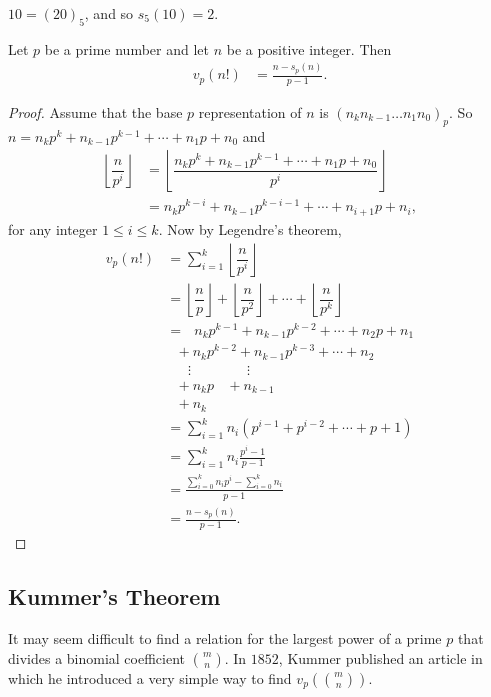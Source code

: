 \documentclass[12pt]{subfile}
\begin{document}
\begin{example}
	$10=(20)_5$, and so $s_5(10)=2$.
\end{example}


\begin{theorem}\label{thm:legendrealternative}
	Let $p$ be a prime number and let $n$ be a positive integer. Then
	\begin{align*}
	v_p(n!) & =\frac{n-s_p(n)}{p-1}.
	\end{align*}
\end{theorem}

\begin{proof}
	Assume that the base $p$ representation of $n$ is $(n_k n_{k-1}\ldots n_1 n_0)_p$. So $n=n_kp^k + n_{k-1}p^{k-1} + \cdots + n_1 p +n_0$ and
	\begin{align*}
	\left\lfloor\dfrac{n}{p^i}\right\rfloor &=	\left\lfloor\dfrac{n_kp^k + n_{k-1}p^{k-1} + \cdots + n_1 p +n_0}{p^i}\right\rfloor \\
	&= n_kp^{k-i} + n_{k-1}p^{k-i-1} + \cdots + n_{i+1} p + n_i,
	\end{align*}
	for any integer $1 \leq i \leq k$. Now by Legendre's theorem,
	\begin{align*}
	v_p(n!) & = \sum_{i=1}^{k}\left\lfloor\dfrac{n}{p^i}\right\rfloor\\
	&= \left\lfloor\dfrac{n}{p}\right\rfloor+\left\lfloor\dfrac{n}{p^2}\right\rfloor+\cdots+\left\lfloor\dfrac{n}{p^k}\right\rfloor\\
	&= \ \ \ n_kp^{k-1} + n_{k-1}p^{k-2} + \cdots + n_{2} p + n_1 \\  &\ \ \ + n_kp^{k-2} + n_{k-1}p^{k-3} + \cdots + n_{2}\\ &\ \ \ \ \ \ \ \vdots \qquad\qquad \vdots\\  &\ \ \ + n_kp  \ \ \ \ + n_{k-1} \\&\ \ \ + n_k\\
	&=\sum_{i=1}^k n_i(p^{i-1}+p^{i-2}+\cdots+p+1)\\
	&= \sum_{i=1}^k n_i\frac{p^i-1}{p-1}\\
	&=\displaystyle \frac{\displaystyle \sum\limits_{i=0}^k n_i p^i - \sum\limits_{i=0}^k n_i}{p-1}\\
	&=\frac{n-s_p(n)}{p-1}.
	\end{align*}
\end{proof}

\subsection{Kummer's Theorem}
It may seem difficult to find a relation for the largest power of a prime $p$ that divides a binomial coefficient $\binom{m}{n}$. In $1852$, Kummer published an article in which he introduced a very simple way to find $v_p\left(\binom{m}{n}\right)$.
\end{document}
